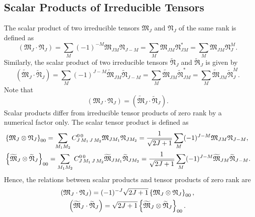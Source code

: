 \subsection{Scalar Products of Irreducible Tensors}\label{sec:3.1.8}
The scalar product of two irreducible tensors $\mathfrak{M}_{J}$ and $\mathfrak{N}_{J}$ of the same rank is defined as
\begin{equation}
\left(\mathfrak{M}_{J} \cdot \mathfrak{N}_{J}\right)=\sum_{M}(-1)^{-M} \mathfrak{M}_{J M} \mathfrak{N}_{J-M}=\sum_{M} \mathfrak{M}_{J M} \mathfrak{N}_{J M}^{*}=\sum_{M} \mathfrak{M}_{J M} \mathfrak{N}_{J}^{M} .\label{eq:3:1:30}
\end{equation}
Similarly, the scalar product of two irreducible tensors $\widetilde{\mathfrak{N}}_{J}$ and $\widetilde{\mathfrak{R}}_{J}$ is given by
\begin{equation*}
\left(\widetilde{\mathfrak{M}}_{J} \cdot \widetilde{\mathfrak{N}}_{J}\right)=\sum_{M}(-1)^{J-M} \widetilde{\mathfrak{M}}_{J M} \widetilde{\mathfrak{N}}_{J-M}=\sum_{M} \widetilde{\mathfrak{M}}_{J M} \widetilde{\mathfrak{N}}_{J M}^{*}=\sum_{M} \widetilde{\mathfrak{M}}_{J M} \widetilde{\mathfrak{N}}_{J}^{M} . 
\end{equation*}
Note that
\begin{equation}
\left(\mathfrak{M}_{J} \cdot \mathfrak{N}_{J}\right)=\left(\widetilde{\mathfrak{M}}_{J} \cdot \widetilde{\mathfrak{N}}_{J}\right) . \label{eq:3:1:31}
\end{equation}
Scalar products differ from irreducible tensor products of zero rank by a numerical factor only. The scalar tensor product is defined as
\begin{align}
& \left\{\mathfrak{M}_{J} \otimes \mathfrak{N}_{J}\right\}_{00}=\sum_{M_{1} M_{2}} C_{J\,M_{1}\,J\,M_{2}}^{0\,0} \mathfrak{M}_{J M_{1}} \mathfrak{N}_{J M_{2}}=\frac{1}{\sqrt{2 J+1}} \sum_{M}(-1)^{J-M} \mathfrak{M}_{J M} \mathfrak{N}_{J-M},  \label{eq:3:1:32}\\
& \left\{\widetilde{\mathfrak{M}}{ }_{J} \otimes \widetilde{\mathfrak{N}}_{J}\right\}_{00}=\sum_{M_{1} M_{2}} C_{J\,M_{1}\,J\,M_{2}}^{0\,0} \widetilde{\mathfrak{M}}_{J M_{1}} \widetilde{\mathfrak{N}}_{J M_{2}}=\frac{1}{\sqrt{2 J+1}} \sum_{M}(-1)^{J-M} \widetilde{\mathfrak{M}}_{J M} \widetilde{\mathfrak{N}}_{J-M} . \label{eq:3:1:33}
\end{align}
Hence, the relations between scalar products and tensor products of zero rank are
\begin{gather}
\left(\mathfrak{M}_{J} \cdot \mathfrak{N}_{J}\right)=(-1)^{-J} \sqrt{2 J+1}\left\{\mathfrak{M}_{J} \otimes \mathfrak{N}_{J}\right\}_{00},  \notag\\
\left(\widetilde{\mathfrak{M}}_{J} \cdot \widetilde{\mathfrak{N}}_{J}\right)=\sqrt{2 J+1}\left\{\widetilde{\mathfrak{M}}_{J} \otimes \widetilde{\mathfrak{N}}_{J}\right\}_{00}. \label{eq:3:1:34}
\end{gather}
